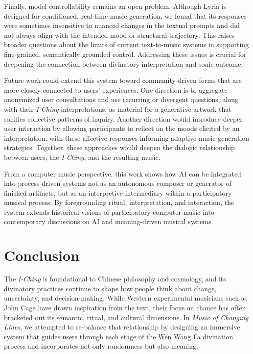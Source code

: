 \documentclass{article}
\begin{document}
Finally, model controllability remains an open problem. Although Lyria is designed for conditioned, real-time music generation, we found that its responses were sometimes insensitive to nuanced changes in the textual prompts and did not always align with the intended mood or structural trajectory. This raises broader questions about the limits of current text-to-music systems in supporting fine-grained, semantically grounded control. Addressing these issues is crucial for deepening the connection between divinatory interpretation and sonic outcome.

Future work could extend this system toward community-driven forms that are more closely connected to users’ experiences. One direction is to aggregate anonymized user consultations and use recurring or divergent questions, along with their \textit{I-Ching} interpretations, as material for a generative artwork that sonifies collective patterns of inquiry. Another direction would introduce deeper user interaction by allowing participants to reflect on the moods elicited by an interpretation, with these affective responses informing adaptive music generation strategies. Together, these approaches would deepen the dialogic relationship between users, the \textit{I-Ching}, and the resulting music.

From a computer music perspective, this work shows how AI can be integrated into process-driven systems not as an autonomous composer or generator of finished artifacts, but as an interpretive intermediary within a participatory musical process. By foregrounding ritual, interpretation, and interaction, the system extends historical visions of participatory computer music into contemporary discussions on AI and meaning-driven musical systems.

\section{Conclusion}
The \textit{I-Ching} is foundational to Chinese philosophy and cosmology, and its divinatory practices continue to shape how people think about change, uncertainty, and decision-making. While Western experimental musicians such as John Cage have drawn inspiration from the text, their focus on chance has often bracketed out its semantic, ritual, and cultural dimensions. In \textit{Music of Changing Lines}, we attempted to re-balance that relationship by designing an immersive system that guides users through each stage of the Wen Wang Fa divination process and incorporates not only randomness but also meaning.
\end{document}
